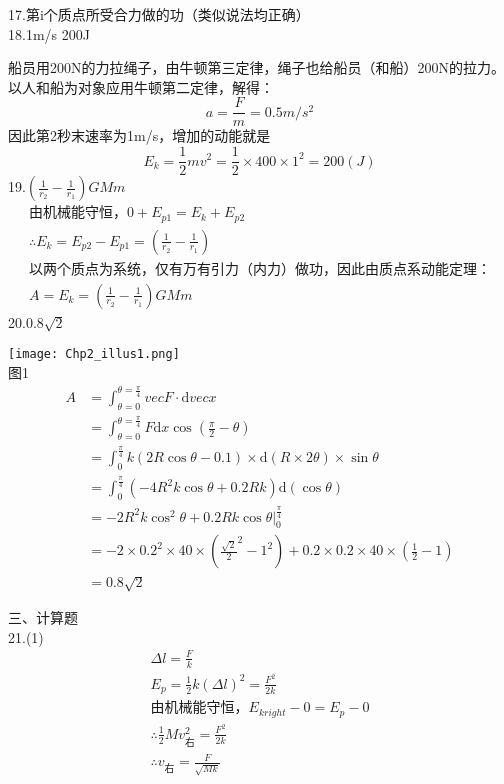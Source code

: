 \documentclass[a4paper,fleqn,twocolumn]{article}
\newcommand{\di}[1]{\mathrm{d}#1}
\begin{document}
   		17.第i个质点所受合力做的功（类似说法均正确）\\
   		18.1m/s \qquad 200J\par
   		船员用200N的力拉绳子，由牛顿第三定律，绳子也给船员（和船）200N的拉力。以人和船为对象应用牛顿第二定律，解得：
   		\[a=\frac{F}{m}=0.5m/s^2\]
   		因此第2秒末速率为1m/s，增加的动能就是
   		\[E_k=\frac{1}{2}mv^2=\frac{1}{2}\times400\times1^2=200(J)\]
   		19.$\left(\frac{1}{r_2}-\frac{1}{r_1}\right)GMm$ 
   		\begin{gather*}
   			\text{由机械能守恒，}0+E_{p1}=E_k+E_{p2}\\
   			\therefore E_k=E_{p2}-E_{p1}=\left(\frac{1}{r_2}-\frac{1}{r_1}\right)\\
   			\text{以两个质点为系统，仅有万有引力（内力）做功，因此由质点系动能定理：}\\
   			A=E_k=\left(\frac{1}{r_2}-\frac{1}{r_1}\right)GMm
   		\end{gather*}
   		20.$0.8\sqrt{2}$\par
   		\centering\texttt{[image: Chp2\_illus1.png]}\\
   		图1
   		\begin{align*}
   			A	&=\int_{\theta=0}^{\theta=\frac{\pi}{4}}{vec{F}}\cdot\di{vec{x}}\\
   				&=\int_{\theta=0}^{\theta=\frac{\pi}{4}}F\di{x}\cos\left(\frac{\pi}{2}-\theta\right)\\
   				&=\int_{0}^{\frac{\pi}{4}}k(2R\cos\theta-0.1)\times\di{(R\times 2\theta)}\times\sin\theta\\
   				&=\int_{0}^{\frac{\pi}{4}}(-4R^2k\cos\theta+0.2Rk)\di{(\cos\theta)}\\
   				&=-2R^2k\cos^2\theta+0.2Rk\cos\theta\left.\right|_0^{\frac{\pi}{4}}\\
   				&=-2\times 0.2^2\times 40\times({\frac{\sqrt{2}}{2}}^2-1^2)+0.2\times 0.2\times 40\times(\frac{1}{2}-1)\\
   				&=0.8\sqrt{2}
   		\end{align*}
   	\raggedright
   	三、计算题\\
   		21.(1)
   		\begin{gather*}
   			\Delta l=\frac{F}{k}\\
   			E_p=\frac{1}{2}k(\Delta l)^2=\frac{F^2}{2k}\\
   			\text{由机械能守恒，}E_{kright}-0=E_p-0\\
   			\therefore\frac{1}{2}Mv_{\text{右}}^2=\frac{F^2}{2k}\\
   			\therefore v_{\text{右}}=\frac{F}{\sqrt{Mk}}
   		\end{gather*}
\end{document}
